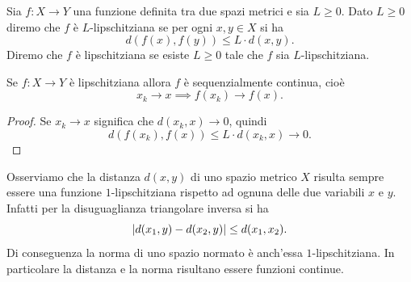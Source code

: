 \begin{definition}[lipschitz]
\mymark{***}
Sia $f\colon X \to Y$ una funzione definita tra due spazi metrici e sia $L\ge 0$.
Dato $L\ge 0$
diremo che $f$ è $L$-lipschitziana se
per ogni $x,y \in X$ si ha
\[
  d(f(x),f(y)) \le L \cdot d(x,y).
\]
Diremo che $f$ è lipschitziana se esiste $L\ge 0$ tale che $f$ sia $L$-lipschitziana.
\end{definition}

\begin{theorem}
\label{th:lipschitz_uniformemente_continua}%
\mymark{*}%
Se $f\colon X \to Y$ è lipschitziana allora
$f$ è sequenzialmente continua, cioè
\[
  x_k \to x \implies f(x_k)\to f(x).
\]
\end{theorem}
%
\begin{proof}
Se $x_k\to x$ significa che $d(x_k,x) \to 0$, quindi
\[
  d(f(x_k), f(x)) \le L \cdot d(x_k,x) \to 0.
\]
\end{proof}

Osserviamo che la distanza $d(x,y)$ di uno spazio metrico $X$ risulta sempre essere una funzione $1$-lip\-schit\-zia\-na rispetto ad ognuna delle due variabili $x$ e $y$. Infatti per la disuguaglianza triangolare inversa si ha
\[
  {\left|d(x_1,y) - d(x_2,y)\right|} \le d(x_1, x_2).
\]
Di conseguenza la norma di uno spazio normato è anch'essa $1$-lip\-schit\-zia\-na. In particolare la distanza e la norma risultano essere funzioni continue.

